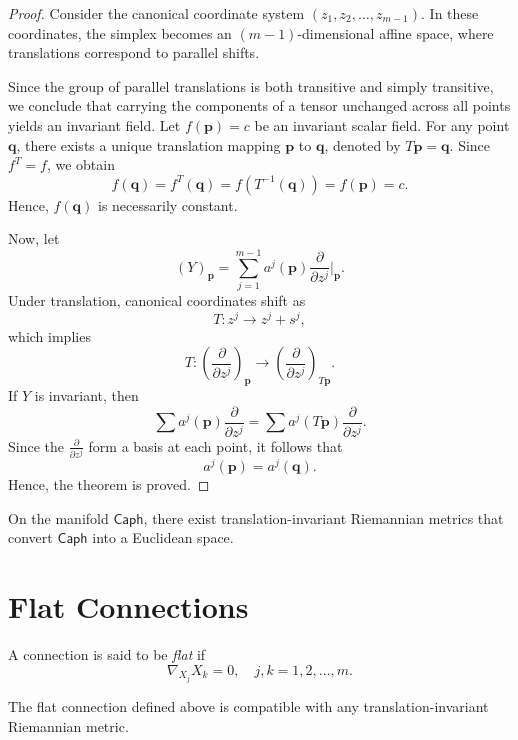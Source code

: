 \begin{proof}
Consider the canonical coordinate system $(z_1, z_2,\dots,z_{m-1})$. In these coordinates, the simplex becomes an $(m-1)$-dimensional affine space, where translations correspond to parallel shifts.

Since the group of parallel translations is both transitive and simply transitive, we conclude that carrying the components of a tensor unchanged across all points yields an invariant field.
Let $f(\mathbf{p})=c$ be an invariant scalar field. For any point $\mathbf{q}$, there exists a unique translation mapping $\mathbf{p}$ to $\mathbf{q}$, denoted by $T\mathbf{p}=\mathbf{q}$. Since $f^T = f$, we obtain
    \[
    f(\mathbf{q})= f^T(\mathbf{q})= f(T^{-1}(\mathbf{q}))= f(\mathbf{p})=c.
    \]
    Hence, $f(\mathbf{q})$ is necessarily constant.

    Now, let
    \[
    (Y)_{\mathbf{p}}= \sum_{j=1}^{m-1} a^j (\mathbf{p})\frac{\partial}{\partial z^j}\Big|_{\mathbf{p}}.
    \]
    Under translation, canonical coordinates shift as
    \[
    T: z^j \longrightarrow z^j + s^j,
    \]
    which implies
    \[
   T:  \left(\frac{\partial}{\partial z^j}\right)_{\mathbf{p}} \longrightarrow \left(\frac{\partial}{\partial z^j}\right)_{T\mathbf{p}}.
    \]
    If $Y$ is invariant, then
    \[
    \sum a^j (\mathbf{p})\frac{\partial}{\partial z^j} = \sum a^j (T\mathbf{p})\frac{\partial}{\partial z^j}.
    \]
    Since the $\frac{\partial}{\partial z^j}$ form a basis at each point, it follows that
    \[
    a^j (\mathbf{p})= a^j (\mathbf{q}).
    \]
    Hence, the theorem is proved.
\end{proof}

\begin{corollary}
    On the manifold $\mathsf{Caph}$, there exist translation-invariant Riemannian metrics that convert $\mathsf{Caph}$ into a Euclidean space.
\end{corollary}

\section{Flat Connections}

\begin{definition}
    A connection is said to be \textit{flat} if
    \[
    \nabla_{X_j}X_k = 0, \quad j,k=1,2,\dots,m.
    \]
\end{definition}

\begin{remark}
    The flat connection defined above is compatible with any translation-invariant Riemannian metric.
\end{remark}


